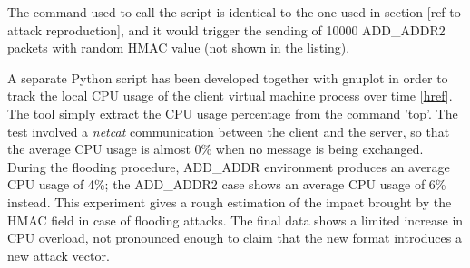 The command used to call the script is identical to the one used in section [ref to attack reproduction], and it would trigger the sending of 10000 ADD\_ADDR2 packets with random HMAC value (not shown in the listing).

A separate Python script has been developed together with gnuplot in order to track the local CPU usage of the client virtual machine process over time [\href{https://github.com/fabriziodemaria/CPU_Monitor}{href}]. The tool simply extract the CPU usage percentage from the command 'top'.
The test involved a \textit{netcat} communication between the client and the server, so that the average CPU usage is almost 0\% when no message is being exchanged. During the flooding procedure, ADD\_ADDR environment produces an average CPU usage of 4\%; the ADD\_ADDR2 case shows an average CPU usage of 6\% instead. %
This experiment gives a rough estimation of the impact brought by the HMAC field in case of flooding attacks. The final data shows a limited increase in CPU overload, not pronounced enough to claim that the new format introduces a new attack vector.